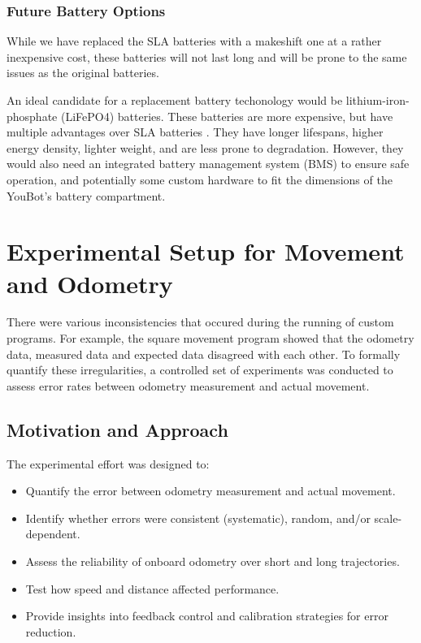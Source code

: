 \documentclass[a4paper, 12pt]{article}
\begin{document}
    \subsubsection{Future Battery Options}

    While we have replaced the SLA batteries with a makeshift one at a rather inexpensive cost, these batteries will not last long and will be prone to the same issues as the original batteries. 

    An ideal candidate for a replacement battery techonology would be lithium-iron-phosphate (LiFePO4) batteries. These batteries are more expensive, but have multiple advantages over SLA batteries \cite{powersonic_lithium_vs_lead}. They have longer lifespans, higher energy density, lighter weight, and are less prone to degradation. However, they would also need an integrated battery management system (BMS) to ensure safe operation, and potentially some custom hardware to fit the dimensions of the YouBot's battery compartment.
    
    

    \pagebreak
    
    \section{Experimental Setup for Movement and Odometry}

    There were various inconsistencies that occured during the running of custom programs. For example, the square movement program showed that the odometry data, measured data and expected data disagreed with each other. To formally quantify these irregularities, a controlled set of experiments was conducted to assess error rates between odometry measurement and actual movement.

    \subsection{Motivation and Approach}

    The experimental effort was designed to:
    \begin{itemize}[noitemsep]
        \item Quantify the error between odometry measurement and actual movement.
        \item Identify whether errors were consistent (systematic), random, and/or scale-dependent.
        \item Assess the reliability of onboard odometry over short and long trajectories.
        \item Test how speed and distance affected performance.
        \item Provide insights into feedback control and calibration strategies for error reduction.
    \end{itemize}
\end{document}
